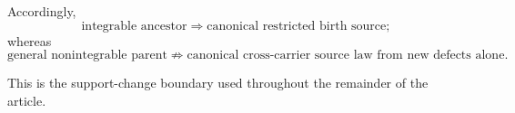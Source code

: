 Accordingly,
\begin{equation}
\boxed{
\text{integrable ancestor}
\Rightarrow
\text{canonical restricted birth source};
}
\end{equation}
whereas
\begin{equation}
\boxed{
\text{general nonintegrable parent}
\not\Rightarrow
\text{canonical cross-carrier source law from new defects alone}.
}
\label{eq:cross-carrier-no-go}
\end{equation}

This is the support-change boundary used throughout the remainder of the article.